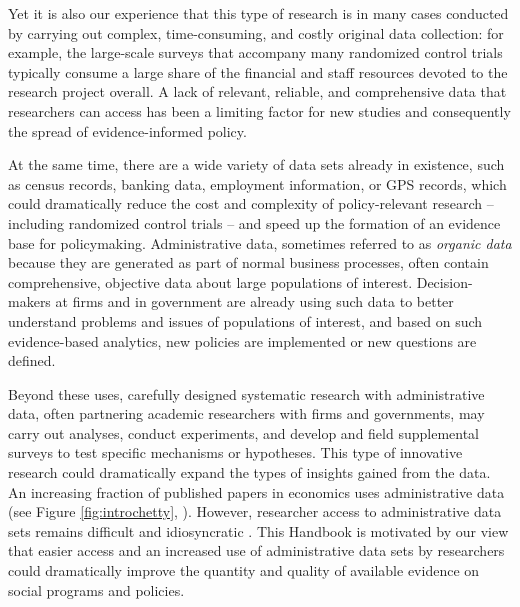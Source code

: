 \documentclass[
]{book}
\begin{document}
Yet it is also our experience that this type of research is in many cases conducted by carrying out complex, time-consuming, and costly original data collection: for example, the large-scale surveys that accompany many randomized control trials typically consume a large share of the financial and staff resources devoted to the research project overall. A lack of relevant, reliable, and comprehensive data that researchers can access has been a limiting factor for new studies and consequently the spread of evidence-informed policy.

At the same time, there are a wide variety of data sets already in existence, such as census records, banking data, employment information, or GPS records, which could dramatically reduce the cost and complexity of policy-relevant research -- including randomized control trials -- and speed up the formation of an evidence base for policymaking. Administrative data, sometimes referred to as \emph{organic data} \citep{groves2011} because they are generated as part of normal business processes, often contain comprehensive, objective data about large populations of interest. Decision-makers at firms and in government are already using such data to better understand problems and issues of populations of interest, and based on such evidence-based analytics, new policies are implemented or new questions are defined.

Beyond these uses, carefully designed systematic research with administrative data, often partnering academic researchers with firms and governments, may carry out analyses, conduct experiments, and develop and field supplemental surveys to test specific mechanisms or hypotheses. This type of innovative research could dramatically expand the types of insights gained from the data. An increasing fraction of published papers in economics uses administrative data (see Figure \ref{fig:introchetty}, \citet{chetty2012}). However, researcher access to administrative data sets remains difficult and idiosyncratic \citep{card2010}. This Handbook is motivated by our view that easier access and an increased use of administrative data sets by researchers could dramatically improve the quantity and quality of available evidence on social programs and policies.
\end{document}
